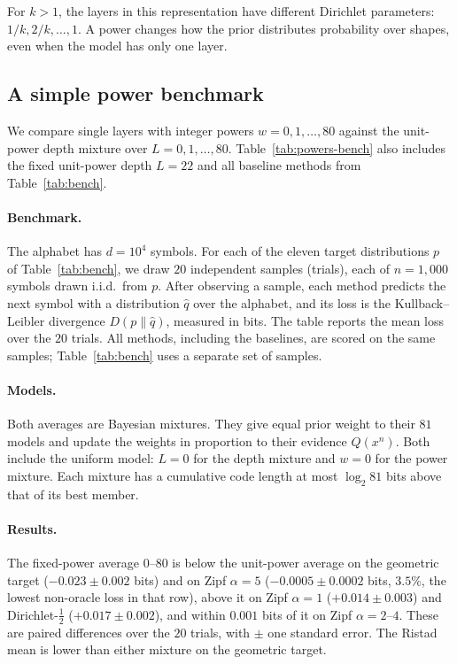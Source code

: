 \documentclass[anon]{alt2027}
\begin{document}
For $k>1$, the layers in this representation have different Dirichlet parameters: $1/k,2/k,\ldots,1$. A power changes how the prior distributes probability over shapes, even when the model has only one layer.

\subsection{A simple power benchmark}
We compare single layers with integer powers $w=0,1,\ldots,80$ against the unit-power depth mixture over $L=0,1,\ldots,80$. Table~\ref{tab:powers-bench} also includes the fixed unit-power depth $L=22$ and all baseline methods from Table~\ref{tab:bench}.

\paragraph{Benchmark.} The alphabet has $d=10^4$ symbols. For each of the eleven target distributions $p$ of Table~\ref{tab:bench}, we draw $20$ independent samples (trials), each of $n=1{,}000$ symbols drawn i.i.d.\ from $p$. After observing a sample, each method predicts the next symbol with a distribution $\widehat q$ over the alphabet, and its loss is the Kullback--Leibler divergence $D(p\|\widehat q)$, measured in bits. The table reports the mean loss over the $20$ trials. All methods, including the baselines, are scored on the same samples; Table~\ref{tab:bench} uses a separate set of samples.

\paragraph{Models.} Both averages are Bayesian mixtures. They give equal prior weight to their $81$ models and update the weights in proportion to their evidence $Q(x^n)$. Both include the uniform model: $L=0$ for the depth mixture and $w=0$ for the power mixture. Each mixture has a cumulative code length at most $\log_2 81$ bits above that of its best member.

\paragraph{Results.} The fixed-power average $0$--$80$ is below the unit-power average on the geometric target ($-0.023\pm0.002$ bits) and on Zipf $\alpha=5$ ($-0.0005\pm0.0002$ bits, $3.5\%$, the lowest non-oracle loss in that row), above it on Zipf $\alpha=1$ ($+0.014\pm0.003$) and Dirichlet-$\frac12$ ($+0.017\pm0.002$), and within $0.001$ bits of it on Zipf $\alpha=2$--$4$. These are paired differences over the $20$ trials, with $\pm$ one standard error. The Ristad mean is lower than either mixture on the geometric target.
\end{document}
